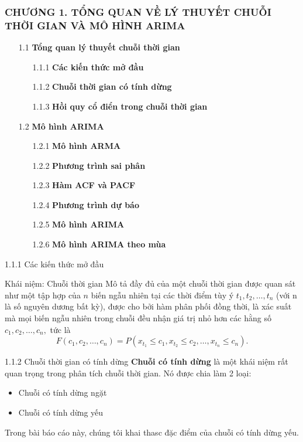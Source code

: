 \documentclass[notheorems,envcountsect,hyperref=unicode]{beamer}
\begin{document}
\begin{frame}
\frametitle{\MakeUppercase{\textsc\bf Chương 1. Tổng quan về lý thuyết chuỗi thời gian và mô hình ARIMA}}
\renewcommand{\baselinestretch}{1.5}
\begin{itemize}
  \item[1.1] \textbf{Tổng quan lý thuyết chuỗi thời gian}
\begin{itemize} 
  \item[1.1.1]\textbf{Các kiến thức mở đầu}
  \item[1.1.2]\textbf{Chuỗi thời gian có tính dừng}
  \item[1.1.3]\textbf{Hồi quy cổ điển trong chuỗi thời gian}
\end{itemize}
\item[1.2] \textbf{Mô hình ARIMA}
\begin{itemize} 
  \item[1.2.1]\textbf{Mô hình ARMA}
  \item[1.2.2]\textbf{Phương trình sai phân}
  \item[1.2.3]\textbf{Hàm ACF và PACF}
  \item[1.2.4]\textbf{Phương trình dự báo}
  \item[1.2.5]\textbf{Mô hình ARIMA}  
  \item[1.2.6]\textbf{Mô hình ARIMA theo mùa} 
\end{itemize}  
\end{itemize}
\end{frame}

\begin{frame}{1.1.1 Các kiến thức mở đầu}
\begin{block}{\textnormal{Khái niệm: Chuỗi thời gian}}
Mô tả đầy đủ của một chuỗi thời gian được quan sát như một tập hợp của $n$ biến ngẫu nhiên tại các thời điểm tùy ý $t_{1}, t_{2}, \dots, t_{n}$ (với n là số nguyên dương bất kỳ), được cho bởi hàm phân phối đồng thời, là xác suất mà mọi biến ngẫu nhiên trong chuỗi đều nhận giá trị nhỏ hơn các hằng số $c_{1}, c_{2}, \dots, c_{n},$ tức là
\begin{equation}
F(c_{1}, c_{2}, \dots, c_{n})= P(x_{t_{1}}\leq c_{1}, x_{t_{2}}\leq c_{2}, \dots, x_{t_{n}}\leq c_{n}). \label{ct1.1}
\end{equation}
\end{block}
\end{frame}

\begin{frame}{1.1.2 Chuỗi thời gian có tính dừng}
\textbf{Chuỗi có tính dừng} là một khái niệm rất quan trọng trong phân tích chuỗi thời gian. Nó được chia làm 2 loại:
\begin{itemize}
	\item Chuỗi có tính dừng ngặt
	\item Chuỗi có tính dừng yếu
\end{itemize}
 Trong bài báo cáo này, chúng tôi khai thasc đặc điểm của chuỗi có tính dừng yếu.
\end{frame}
\end{document}
